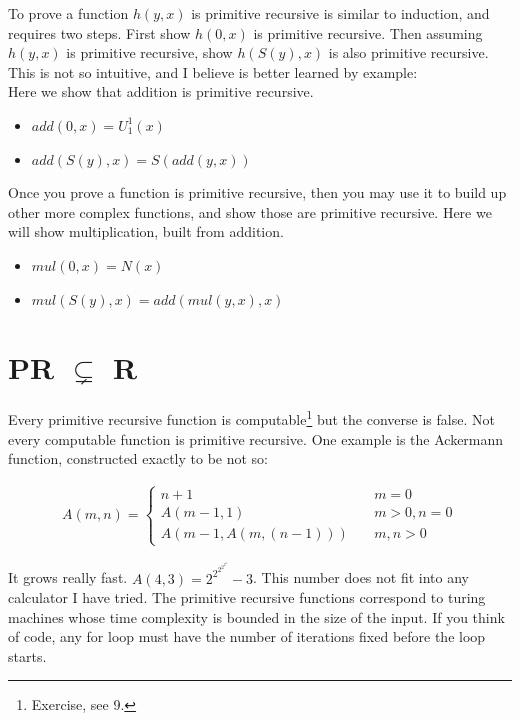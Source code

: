 \documentclass[11pt]{article}
\begin{document}
To prove a function $h(y, x)$ is primitive recursive is similar to induction, and requires two steps. First show $h(0, x)$ is primitive recursive. Then assuming $h(y,x)$ is primitive recursive, show $h(S(y), x)$ is also primitive recursive. This is not so intuitive, and I believe is better learned by example:\\

Here we show that addition is primitive recursive.
\begin{itemize}
    \item $add(0,x) = U^1_1(x)$
    \item $add(S(y),x) = S(add(y,x))$
\end{itemize}

Once you prove a function is primitive recursive, then you may use it to build up other more complex functions, and show those are primitive recursive. Here we will show multiplication, built from addition.
\begin{itemize}
    \item $mul(0,x) = N(x)$
    \item $mul(S(y),x) = add(mul(y,x), x)$
\end{itemize}

\section{PR $\subsetneq$ R}
Every primitive recursive function is computable\footnote{Exercise, see 9.} but the converse is false. Not every computable function is primitive recursive. One example is the Ackermann function, constructed exactly to be not so:
    
\begin{align*}
    A(m,n) = \left\{\begin{array}{ll}
            n+1 & \quad m = 0 \\
            A(m-1,1) & \quad m > 0, n = 0 \\
            A(m-1,A(m,(n-1))) & \quad m,n > 0
        \end{array} \right.
\end{align*}


It grows really fast. $A(4,3) = 2^{2^{2^{2^{2^{2}}}}} -3$. This number does not fit into any calculator I have tried. The primitive recursive functions correspond to turing machines whose time complexity is bounded in the size of the input. If you think of code, any for loop must have the number of iterations fixed before the loop starts.
\end{document}
